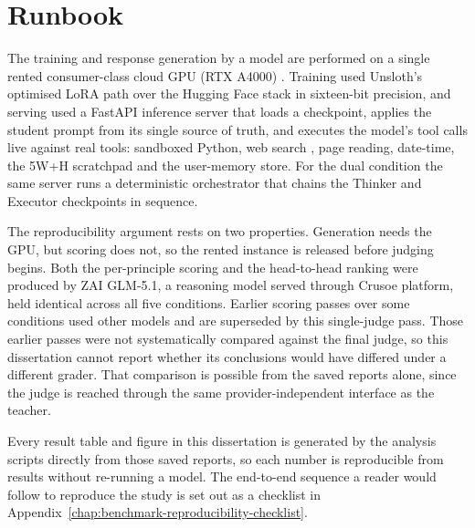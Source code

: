 \section{Runbook}
\label{subsec:mr-runbook}

The training and response generation by a model are performed on a single rented consumer-class cloud GPU (RTX A4000) \cite{vastai}. Training used Unsloth's optimised LoRA path \cite{unsloth2024} over the Hugging Face stack \cite{huggingfacetransformers} in sixteen-bit precision, and serving used a FastAPI \cite{fastapi} inference server that loads a checkpoint, applies the student prompt from its single source of truth, and executes the model's tool calls live against real tools: sandboxed Python, web search \cite{exaai}, page reading, date-time, the 5W+H scratchpad and the user-memory store. For the dual condition the same server runs a deterministic orchestrator that chains the Thinker and Executor checkpoints in sequence.

The reproducibility argument rests on two properties. Generation needs the GPU, but scoring does not, so the rented instance is released before judging begins. Both the per-principle scoring and the head-to-head ranking were produced by ZAI GLM-5.1, a reasoning model served through Crusoe platform, held identical across all five conditions. Earlier scoring passes over some conditions used other models and are superseded by this single-judge pass. Those earlier passes were not systematically compared against the final judge, so this dissertation cannot report whether its conclusions would have differed under a different grader. That comparison is possible from the saved reports alone, since the judge is reached through the same provider-independent interface as the teacher.

Every result table and figure in this dissertation is generated by the analysis scripts directly from those saved reports, so each number is reproducible from results without re-running a model. The end-to-end sequence a reader would follow to reproduce the study is set out as a checklist in Appendix~\ref{chap:benchmark-reproducibility-checklist}.

